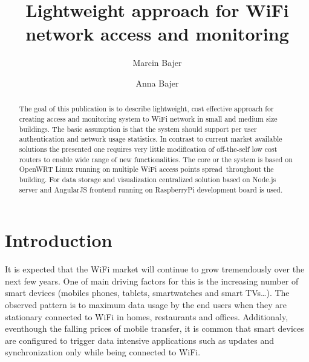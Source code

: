 \documentclass{llncs}
\begin{document}
%
\frontmatter          %
%
\pagestyle{headings}  %
%
\mainmatter              %
%
\title{Lightweight approach for WiFi network access and monitoring}

\author{Marcin Bajer \and Anna Bajer}
%
%
%

\maketitle              %

\begin{abstract}
The goal of this publication is to describe lightweight, cost effective approach
for creating access and monitoring system to WiFi network in small and medium
size buildings.
The basic assumption is that the system should support per user
authentication and network usage statistics.
In contrast to current market available solutions the presented one requires
very little modification of off-the-self low cost routers to enable wide range
of new functionalities. The core or the system is based on OpenWRT Linux running
on multiple WiFi access points spread throughout the building.
For data storage and visualization centralized solution 
based on Node.js server and AngularJS frontend running on RaspberryPi
development board is used.
\end{abstract}
%
\section{Introduction}
%

It is expected that the WiFi market will continue to grow tremendously over the
next few years. One of main driving factors for this is the increasing number of
smart devices (mobiles phones, tablets, smartwatches and smart TVs\ldots). The
observed pattern is to maximum data usage by the end users when they are
stationary connected to WiFi in homes, restaurants and offices.
Additionaly, eventhough the falling prices of mobile transfer, it is common that
smart devices are configured to trigger data intensive applications such as
updates and synchronization only while being connected to WiFi.
\end{document}
